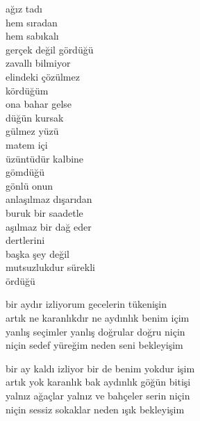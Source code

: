 \documentclass[10pt, openright, oneside]{memoir}
\theoremstyle{definition}
\begin{document}
\vspace*{\fill}
%
\newpage
{}
\vspace*{\fill}
\settowidth{\versewidth}{gerçek değil gördüğü}
\begin{cverse}
  ağız tadı \\
  hem sıradan \\
  hem sabıkalı \\
  gerçek değil gördüğü \\
  zavallı bilmiyor \\
  elindeki çözülmez \\
  kördüğüm \\
  ona bahar gelse \\
  düğün kursak \\
  gülmez yüzü \\
  matem içi \\
  üzüntüdür kalbine \\
  gömdüğü \\
  gönlü onun \\
  anlaşılmaz dışarıdan \\
  buruk bir saadetle \\
  aşılmaz bir dağ eder \\
  dertlerini \\
  başka şey değil \\
  mutsuzlukdur sürekli \\
  ördüğü \\
\end{cverse}
\vspace*{\fill}
%
\newpage
{}
\vspace*{\fill}
\settowidth{\versewidth}{bir ay kaldı izliyor bir de benim yokdur işim}
\begin{cverse}
  bir aydır izliyorum gecelerin tükenişin \\
  artık ne karanlıkdır ne aydınlık benim içim \\
  yanlış seçimler yanlış doğrular doğru niçin \\
  niçin sedef yüreğim neden seni bekleyişim

  bir ay kaldı izliyor bir de benim yokdur işim \\
  artık yok karanlık bak aydınlık göğün bitişi \\
  yalnız ağaçlar yalnız ve bahçeler serin niçin \\
  niçin sessiz sokaklar neden ışık bekleyişim \\
\end{cverse}
\end{document}
